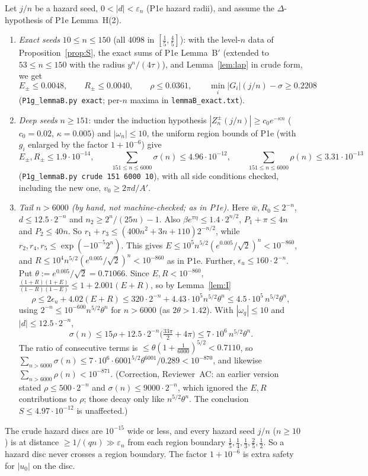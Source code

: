 \documentclass[11pt]{article}
\theoremstyle{definition}\newtheorem{definition}[theorem]{Definition}
\theoremstyle{remark}\newtheorem{remark}[theorem]{Remark}
\begin{document}
\begin{lemma}\label{lem:B}
Let $j/n$ be a hazard seed, $0<|d|<\varepsilon_n$ (P1e hazard radii), and assume the $\Delta$-hypothesis of P1e Lemma~H(2).
\begin{enumerate}
\item[(i)] \emph{Exact seeds} $10\le n\le150$ (all 4098 in $[\frac15,\frac45]$): with the level-$n$ data of Proposition~\ref{prop:S}, the exact sums of P1e Lemma~B$'$ (extended to $53\le n\le150$ with the radius $y^n/(4\tau)$), and Lemma~\ref{lem:lap} in crude form, we get
\[E_\pm\le0.0048,\qquad R_\pm\le0.0040,\qquad\rho\le0.0361,\qquad\min_i|G_i|(j/n)-\sigma\ge0.2208\]
(\texttt{P1g\_lemmaB.py exact}; per-$n$ maxima in \texttt{lemmaB\_exact.txt}).
\item[(ii)] \emph{Deep seeds} $n\ge151$: under the induction hypothesis $|Z^\pm_n(j/n)|\ge c_0e^{-\kappa n}$ ($c_0=0.02$, $\kappa=0.005$) and $|\omega_n|\le10$, the uniform region bounds of P1e (with $g_i$ enlarged by the factor $1+10^{-6}$) give
\[E_\pm,R_\pm\le1.9\cdot10^{-14},\qquad\sum_{151\le n\le6000}\sigma(n)\le4.96\cdot10^{-12},\qquad\sum_{151\le n\le6000}\rho(n)\le3.31\cdot10^{-13}\]
(\texttt{P1g\_lemmaB.py crude 151 6000 10}), with all side conditions checked, including the new one, $v_0\ge2\pi d/A'$.
\item[(iii)] \emph{Tail $n>6000$ (by hand, not machine-checked; as in P1e).} Here $\bar w,R_0\le2^{-n}$, $d\le12.5\cdot2^{-n}$ and $n_2\ge2^n/(25n)-1$. Also $\beta e^{\pi\eta}\le1.4\cdot2^{n/2}$, $P_1+\pi\le4n$ and $P_2\le40n$. So $r_1+r_3\le(400n^2+3n+110)2^{-n/2}$, while $r_2,r_4,r_5\le\exp(-10^{-5}2^{n})$. This gives $E\le10^5n^{5/2}(e^{0.005}/\sqrt2)^n<10^{-860}$, and $R\le10^4n^{5/2}(e^{0.005}/\sqrt2)^n<10^{-860}$ as in P1e.
 Further, $\epsilon_u\le160\cdot2^{-n}$. Put $\theta:=e^{0.005}/\sqrt2=0.71066$. Since $E,R<10^{-860}$, $\frac{(1+R)(1+E)}{(1-R)(1-E)}\le1+2.001(E+R)$, so by Lemma~\ref{lem:I}
 \[\rho\le2\epsilon_u+4.02(E+R)\le320\cdot2^{-n}+4.43\cdot10^5n^{5/2}\theta^n\le4.5\cdot10^5\,n^{5/2}\theta^n,\]
 using $2^{-n}\le10^{-600}n^{5/2}\theta^n$ for $n>6000$ (as $2\theta>1.42$). With $|\omega_q|\le10$ and $|d|\le12.5\cdot2^{-n}$,
 \[\sigma(n)\le15\rho+12.5\cdot2^{-n}\big(\tfrac{33\pi}2+4\pi\big)\le7\cdot10^6\,n^{5/2}\theta^n .\]
 The ratio of consecutive terms is $\le\theta(1+\frac1{6000})^{5/2}<0.7110$, so $\sum_{n>6000}\sigma(n)\le7\cdot10^6\cdot6001^{5/2}\theta^{6001}/0.289<10^{-870}$, and likewise $\sum_{n>6000}\rho(n)<10^{-871}$.
 (Correction, Reviewer~AC: an earlier version stated $\rho\le500\cdot2^{-n}$ and $\sigma(n)\le9000\cdot2^{-n}$, which ignored the $E,R$ contributions to $\rho$; those decay only like $n^{5/2}\theta^n$. The conclusion $S\le4.97\cdot10^{-12}$ is unaffected.)
\end{enumerate}
\end{lemma}
The crude hazard discs are $10^{-15}$ wide or less, and every hazard seed $j/n$ ($n\ge10$) is at distance $\ge1/(qn)\gg\varepsilon_n$ from each region boundary $\frac15,\frac14,\frac13,\frac25,\frac12$. So a hazard disc never crosses a region boundary. The factor $1+10^{-6}$ is extra safety for $|u_0|$ on the disc.
\end{document}
